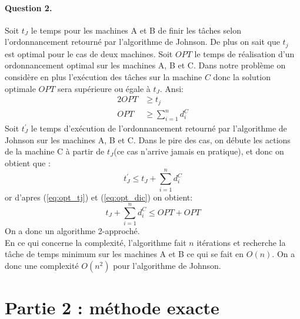 \documentclass[a4paper, 10pt]{article}
\begin{document}
	\paragraph{Question 2.}{Soit $t_J$ le temps pour les machines A et B de finir les tâches selon l'ordonnancement retourné par l'algorithme de Johnson. De plus on sait que $t_j$ est optimal pour le cas de deux machines. Soit $OPT$ le temps de réalisation d'un ordonnancement optimal sur les machines A, B et C.
          Dans notre problème on considère en plus l'exécution des tâches sur la machine $C$ donc la solution optimale $OPT$ sera supérieure ou égale à $t_J$. Ansi:
          \begin{alignat}{2}
          	\label{eq:opt_tj}
          	OPT &\geq t_j \\
          	\label{eq:opt_dic}
          	OPT &\geq \sum_{i=1}^n d_i^C
          \end{alignat}
          Soit $t^\prime_J$ le temps d'exécution de l'ordonnancement retourné par l'algorithme de Johnson sur les machines A, B et C. Dans le pire des cas, on débute les actions de la machine C à partir de $t_J$(ce cas n'arrive jamais en pratique), et donc on obtient que :
          \begin{equation*}
	          t^\prime_J \le t_J + \sum_{i=1}^n d_i^C
	      \end{equation*}
	      or d'apres (\ref{eq:opt_tj}) et (\ref{eq:opt_dic}) on obtient:
		\begin{equation*}
			t_J + \sum_{i=1}^n d_i^C \le OPT + OPT
		\end{equation*}
		On a donc un algorithme 2-approché.\\[0.35cm]
		En ce qui concerne la complexité, l'algorithme fait $n$ itérations et recherche la tâche de temps minimum sur les machines A et B ce qui se fait en $O(n)$. On a donc une complexité $O(n^2)$ pour l'algorithme de Johnson.
		}
		
	\section*{Partie 2 : méthode exacte}
		
\end{document}
